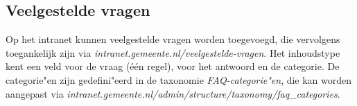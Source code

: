 \subsection{Veelgestelde vragen}\label{veelgestelde vragen}
Op het intranet kunnen veelgestelde vragen worden toegevoegd, die vervolgens toegankelijk zijn via \emph{intranet.gemeente.nl/veelgestelde-vragen}. Het inhoudstype kent een veld voor de vraag (\'{e}\'{e}n regel), voor het antwoord en de categorie. De categorie"en zijn gedefini"eerd in de taxonomie \emph{FAQ-categorie"en}, die kan worden aangepast via \emph{intranet.gemeente.nl/admin/structure/taxonomy/faq\_categories}.